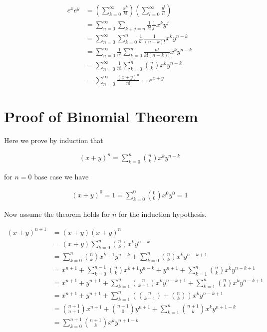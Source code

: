 \documentclass[12pt]{article}
\begin{document}
\begin{align}
e^x e^y &= \left(\sum_{k=0}^{\infty} \frac{x^k}{k!} \right) \left(\sum_{l=0}^{\infty} \frac{y^l}{l!} \right)\\
&= \sum_{n=0}^{\infty}\sum_{k+j=n} \frac{1}{k!}\frac{1}{j!} x^k y^j \\
&= \sum_{n=0}^{\infty} \sum_{k=0}^n \frac{1}{k!}\frac{1}{(n-k)!} x^k y^{n-k}\\
&= \sum_{n=0}^{\infty}\frac{1}{n!}\sum_{k=0}^n \frac{n!}{k!(n-k)!} x^k y^{n-k}\\
&= \sum_{n=0}^{\infty} \frac{1}{n!} \sum_{k=0}^n \binom{n}{k} x^k y^{n-k}\\
&= \sum_{n=0}^{\infty} \frac{(x+y)^n}{n!} = e^{x+y}
\end{align}

\section{Proof of Binomial Theorem}

Here we prove by induction that

\begin{align}
(x+y)^n = \sum_{k=0}^n \binom{n}{k} x^k y^{n-k}
\end{align}

for $n=0$ base case we have

\begin{align}
(x+y)^0 = 1 = \sum_{k=0}^0 \binom{0}{0} x^0 y^0 = 1
\end{align}

Now assume the theorem holds for $n$ for the induction hypothesis.

\begin{equation}
\begin{aligned}
(x+y)^{n+1} &= (x+y)(x+y)^n\\
&= (x+y) \sum_{k=0}^n \binom{n}{k} x^k y^{n-k}\\
&= \sum_{k=0}^n \binom{n}{k} x^{k+1} y^{n-k} + \sum_{k=0}^n \binom{n}{k}x^k y^{n-k+1}\\
&= x^{n+1} + \sum_{k=0}^{n-1} \binom{n}{k} x^{k+1}y^{n-k} + y^{n+1} +  \sum_{k=1}^n \binom{n}{k} x^k y^{n-k+1}\\
&= x^{n+1} + y^{n+1} + \sum_{k=1}^n \binom{n}{k-1} x^k y^{n-k+1} + \sum_{k=1}^n \binom{n}{k}x^k y^{n-k+1}\\
&= x^{n+1} + y^{n+1} + \sum_{k=1}^n \left(\binom{n}{k-1} + \binom{n}{k} \right)x^k y^{n-k+1}\\
&= \binom{n+1}{n+1}x^{n+1} + \binom{n+1}{0}y^{n+1} + \sum_{k=1}^n \binom{n+1}{k} x^k y^{n+1-k}\\
&= \sum_{k=0}^{n+1}\binom{n+1}{k}x^k y^{n+1-k}
\end{aligned}
\end{equation}
\end{document}
